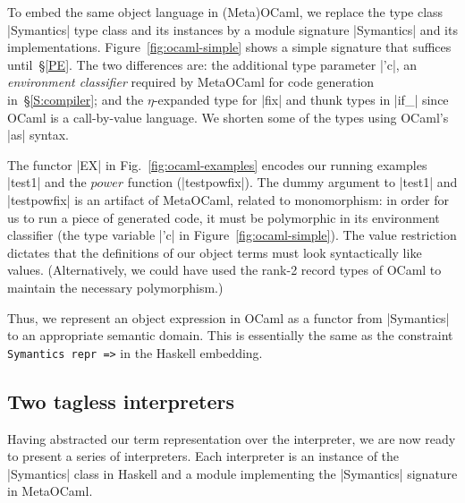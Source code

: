 To embed the same object language in (Meta)OCaml, we replace the \ifshort type
class \fi |Symantics| \ifshort\else type class \fi and its instances by a module signature |Symantics|
and its implementations.  Figure~\ref{fig:ocaml-simple} shows a simple
signature that suffices until~\S\ref{PE}.  The two differences are:
the additional type parameter |'c|, an
\emph{environment classifier} \citep{WalidPOPL03} required by MetaOCaml for
code generation in~\S\ref{S:compiler}; and the $\eta$-expanded type for
|fix| and thunk types in |if_| since OCaml is a call-by-value
language.
We shorten some of the types using OCaml's |as| syntax.

The functor |EX| in Fig.~\ref{fig:ocaml-examples} encodes 
our running examples |test1| and the $\mathit{power}$ function
(|testpowfix|).
The dummy argument to |test1| and |testpowfix| is an artifact of
MetaOCaml, related to monomorphism: in order for us to run a
piece of generated code, it must be polymorphic in its environment
classifier (the type variable |'c| in Figure~\ref{fig:ocaml-simple}).
The value restriction dictates that
the definitions of our object terms must look syntactically like
values. (Alternatively, we could have used
the rank-2 record types of OCaml to maintain the necessary polymorphism.)
\ifshort\else\par\fi
Thus, we represent an object expression in
OCaml as a functor from |Symantics| to an appropriate semantic domain. This
is essentially the same as the constraint \texttt{Symantics repr =>} in the
Haskell embedding.

\subsection{Two tagless interpreters}
\label{S:interpreter-RL}

Having abstracted our term representation over the interpreter, we are
now ready to present a series of interpreters.  Each interpreter is an
instance of the |Symantics| class in Haskell and a module implementing
the |Symantics| signature in MetaOCaml.

